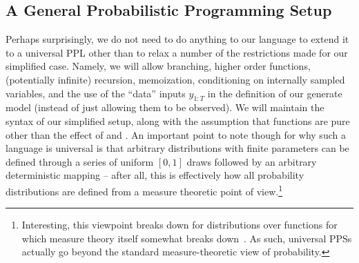 %
%

\subsection{A General Probabilistic Programming Setup}
\label{sec:probprog:models:general}

Perhaps surprisingly, we do not need to do anything to our language to extend it to a universal
PPL other than to relax a number of the restrictions made for our simplified case.  Namely,
we will allow branching, higher order functions, (potentially infinite) recursion, memoization, conditioning on internally sampled
variables, and the use of the ``data'' inputs $y_{1:T}$ in the definition of our generate model (instead of
just allowing them to be observed).  We will maintain the syntax of our simplified
setup, along with the assumption that functions are pure other than the effect of \sample and \observe.
An important point to note though for why such a language is universal is that arbitrary distributions
with finite parameters can be defined through a series of uniform $[0,1]$ draws followed
by an arbitrary deterministic mapping -- after all, this is effectively how all probability distributions are
defined from a measure theoretic point of view.\footnote{Interesting, this viewpoint breaks down for
	distributions over functions for which measure theory itself somewhat breaks down~\cite{heunen2017convenient}.
	As such, universal PPSs actually go beyond the standard measure-theoretic view of probability.}


